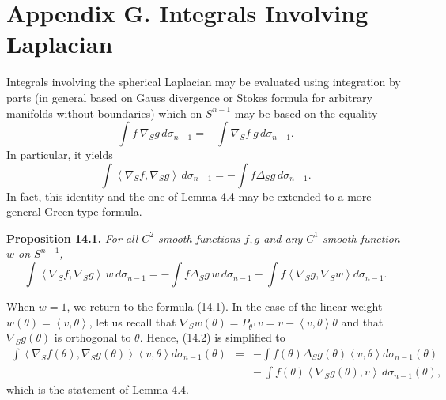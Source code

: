 \documentclass[reqno,12pt]{amsart}
\theoremstyle{plain}
\begin{document}
\vskip10mm
\section{{\bf Appendix G. Integrals Involving Laplacian}}
\setcounter{equation}{0}

\vskip2mm
\noindent
Integrals involving the spherical Laplacian may be evaluated using 
integration by parts (in general based on Gauss divergence or Stokes 
formula for arbitrary manifolds without boundaries) which on $S^{n-1}$
may be based on the equality
$$
\int f \ \nabla_S g\,d\sigma_{n-1} = -
\int \nabla_S f \ g\,d\sigma_{n-1}.
$$
In particular, it yields
\begin{equation}
\int \left<\nabla_S f,\nabla_S g\right>\,d\sigma_{n-1} = -
\int f \Delta_S g\,d\sigma_{n-1}.
\end{equation}
In fact, this identity and the one of Lemma 4.4 may be extended to a more 
general Green-type formula.

\vskip5mm
{\bf Proposition 14.1.} {\it For all $C^2$-smooth functions $f,g$ and any
$C^1$-smooth function $w$ on $S^{n-1}$,
\begin{equation}
\int \left<\nabla_S f,\nabla_S g\right>\,w\,d\sigma_{n-1} = -
\int f\Delta_S g\,w\,d\sigma_{n-1}-
\int f\left<\nabla_S g,\nabla_S w\right> d\sigma_{n-1}.
\end{equation}
}

\vskip2mm
When $w=1$, we return to the formula (14.1). In the case of the linear 
weight $w(\theta) = \left<v,\theta\right>$, let us recall that 
$\nabla_S w(\theta) = P_{\theta^\perp} v = v - \left<v,\theta\right>\theta$ 
and that $\nabla_S g(\theta)$ is orthogonal to $\theta$. Hence, (14.2)
is simplified to
\begin{eqnarray*}
\int \left<\nabla_S f(\theta),\nabla_S g(\theta)\right>\left<v,\theta\right> 
d\sigma_{n-1}(\theta)
 & = &
-
\int f(\theta)\Delta_S g(\theta)\left<v,\theta\right> d\sigma_{n-1}(\theta) \\
 & & - \ 
\int f(\theta)\left<\nabla_S g(\theta),v\right>\,d\sigma_{n-1}(\theta),
\end{eqnarray*}
which is the statement of Lemma 4.4.
\end{document}
